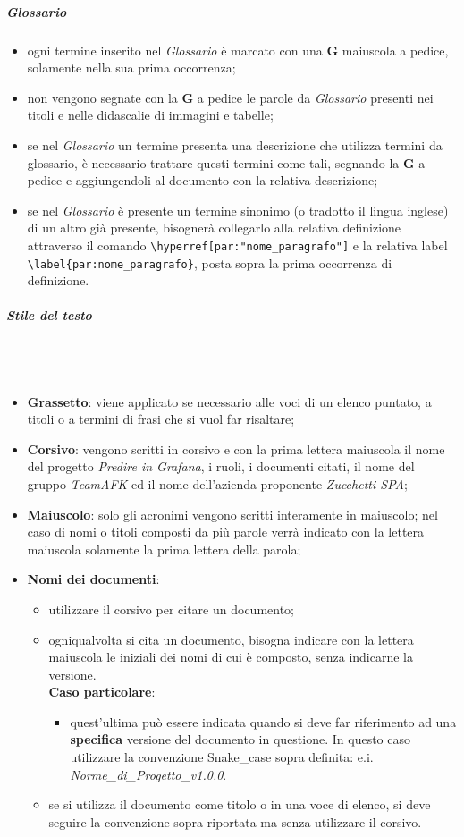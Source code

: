 \subparagraph*{Glossario}
\begin{itemize}
\item ogni termine inserito nel \textit{Glossario} è marcato con una \textbf{G} maiuscola a pedice, solamente nella sua prima occorrenza;
\item non vengono segnate con la \textbf{G} a pedice le parole da \textit{Glossario} presenti nei titoli e nelle didascalie di immagini e tabelle;
\item se nel \textit{Glossario} un termine presenta una descrizione che utilizza termini da glossario, è necessario trattare questi termini come tali, segnando la \textbf{G} a pedice e aggiungendoli al documento con la relativa descrizione;
\item se nel \textit{Glossario} è presente un termine sinonimo (o tradotto il lingua inglese) di un altro già presente, bisognerà collegarlo alla relativa definizione attraverso il comando \verb|\hyperref[par:"nome_paragrafo"]| e la relativa label \verb|\label{par:nome_paragrafo}|, posta sopra la prima occorrenza di definizione.
\end{itemize}

\subparagraph*{Stile del testo}\mbox{} \\ \mbox{} \\
\begin{itemize}
\item \textbf{Grassetto}: viene applicato se necessario alle voci di un elenco puntato, a titoli o a termini di frasi che si vuol far risaltare;
\item \textbf{Corsivo}: vengono scritti in corsivo e con la prima lettera maiuscola il nome del progetto \textit{Predire in Grafana}, i ruoli, i documenti citati, il nome del gruppo \textit{TeamAFK} ed il nome dell'azienda proponente \textit{Zucchetti SPA};
\item \textbf{Maiuscolo}: solo gli acronimi vengono scritti interamente in maiuscolo; nel caso di nomi o titoli composti da più parole verrà indicato con la lettera maiuscola solamente la prima lettera della parola;
\item \textbf{Nomi dei documenti}: 
\begin{itemize}
\item utilizzare il corsivo per citare un documento;
\item ogniqualvolta si cita un documento, bisogna indicare con la lettera maiuscola le iniziali dei nomi di cui è composto, senza indicarne la versione. \\ \textbf{Caso particolare}:
\begin{itemize}
\item quest'ultima può essere indicata quando si deve far riferimento ad una \textbf{specifica} versione del documento in questione. In questo caso utilizzare la convenzione Snake\_case sopra definita: e.i. \textit{Norme\_di\_Progetto\_v1.0.0}.
\end{itemize}
\item se si utilizza il documento come titolo o in una voce di elenco, si deve seguire la convenzione sopra riportata ma senza utilizzare il corsivo. 
\end{itemize}
\end{itemize}

